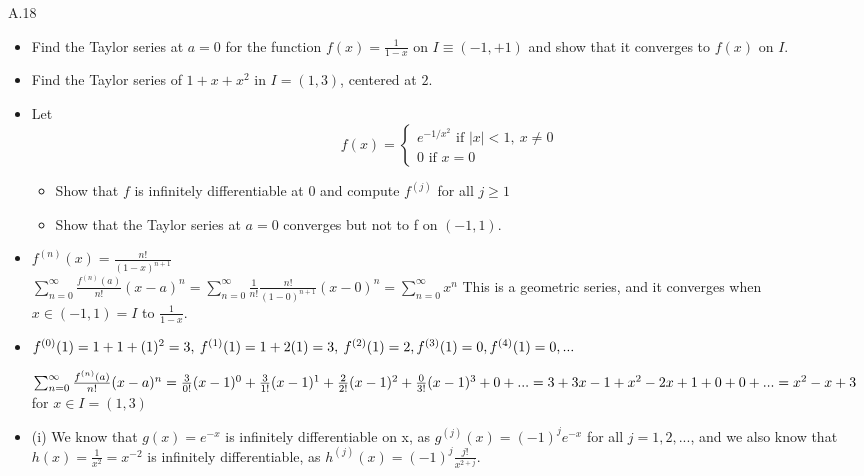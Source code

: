 \documentclass[12pt,letterpaper, onecolumn]{exam}
\newcommand{\ifc}{\textrm{ if }}
\newcommand{\cutesum}[1]{\sum_{#1 = 0}^{\infty}}
\begin{document}
\begin{questions}
    \question 
    A.18 
    \begin{itemize}
    \item[(a)] Find the Taylor series at $a = 0$ for the function $f(x) = \frac{1}{1-x}$ on $I \equiv (-1,+1)$ and show that it converges to $f(x)$ on $I$.
    \item[(b)] Find the Taylor series of $1+x+x^2$ in $I=(1,3)$, \: centered at $2$.
    \item[(c)] Let
    \[f(x) = \begin{cases}
        e^{-1/x^2} \ifc |x| < 1, \: x \neq 0 \\
        0 \ifc x = 0
    \end{cases}\]
    \begin{itemize}
    \item[(i)] Show that $f$ is infinitely differentiable at $0$ and compute $f^{(j)}$ for all $j \geq 1$
    \item[(ii)] Show that the Taylor series at $a = 0$ converges but not to f on $(-1, 1)$.
    \end{itemize}
    \end{itemize}
    \begin{solution}
    \begin{itemize}
    \item[(a)]
    $f^{(n)}(x) = \frac{n!}{(1-x)^{n+1}}$ \\
    $\sum_{n=0}^\infty \frac{f^{(n)}(a)}{n!}(x-a)^n = \cutesum{n} \frac{1}{n!}\frac{n!}{(1-0)^{n+1}} (x-0)^n = \cutesum{n} x^n$
    This is a geometric series, and it converges when $x \in (-1,1) = I$ to $\frac{1}{1-x}.$
    \item[(b)]
    $f^{(0)}(1) = 1 + 1 + (1)^2 = 3, \: f^{(1)}(1) = 1 + 2(1) = 3, \: f^{(2)}(1) = 2, \\f^{(3)}(1) = 0, f^{(4)}(1) = 0 , ...$
    
    $\cutesum{n}\frac{f^{(n)}(a)}{n!}(x-a)^n = \frac{3}{0!}(x-1)^0 + \frac{3}{1!}(x-1)^1 + \frac{2}{2!}(x-1)^2 + \frac{0}{3!}(x-1)^3 + 0 + ... \\ = 3 + 3x - 1 + x^2 -2x + 1 + 0 + 0 + ... \\ = x^2 - x + 3$ for $x \in I = (1, 3)$

    
    \item[(c)] 
    (i) We know that $g(x) = e^{-x}$ is infinitely differentiable on x, as $g^{(j)}(x) = (-1)^{j}e^{-x}$ for all $j = 1, 2, ...$, and we also know that $h(x) = \frac{1}{x^2} = x^{-2}$ is infinitely differentiable, as $h^{(j)}(x) = (-1)^{j}\frac{j!}{x^{2+j}}$.


\end{itemize}
\end{solution}
\end{questions}
\end{document}
